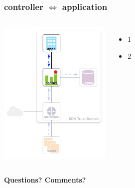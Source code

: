 \documentclass[t,handout]{beamer}
\begin{document}
\begin{frame}
\frametitle{controller $\Longleftrightarrow$  application}
\begin{columns}[T]
\includegraphics[height=2.75in]{ra-c-a}
\begin{itemize}
\item 1
\item 2
\end{itemize}
\end{columns}
\end{frame}

\begin{frame}[c]
\begin{center}
\textbf{Questions? Comments?}
\end{center}
\end{frame}
\end{document}

